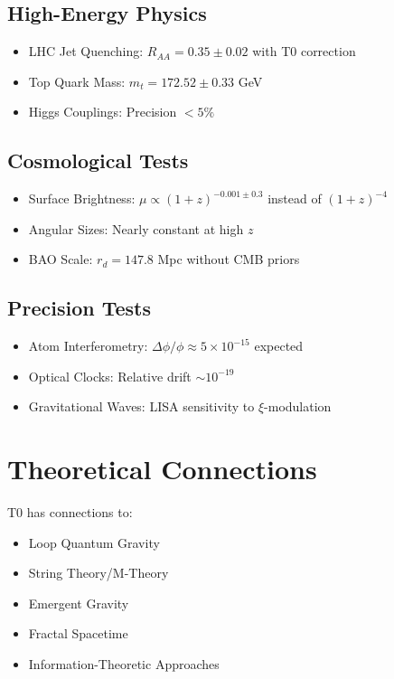 	\subsection{High-Energy Physics}
	\begin{itemize}
		\item LHC Jet Quenching: $R_{AA} = 0.35 \pm 0.02$ with T0 correction \cite{cms2024, alice2023}
		\item Top Quark Mass: $m_t = 172.52 \pm 0.33$ GeV \cite{cms2023top}
		\item Higgs Couplings: Precision $< 5\%$ \cite{atlas2023higgs}
	\end{itemize}
	
	\subsection{Cosmological Tests}
	\begin{itemize}
		\item Surface Brightness: $\mu \propto (1+z)^{-0.001\pm0.3}$ instead of $(1+z)^{-4}$ \cite{lerner2014}
		\item Angular Sizes: Nearly constant at high $z$ \cite{lopez2010}
		\item BAO Scale: $r_d = 147.8$ Mpc without CMB priors \cite{desi2025}
	\end{itemize}
	
	\subsection{Precision Tests}
	\begin{itemize}
		\item Atom Interferometry: $\Delta\phi/\phi \approx 5 \times 10^{-15}$ expected \cite{kasevich2023}
		\item Optical Clocks: Relative drift $\sim 10^{-19}$ \cite{ludlow2015, brewer2019}
		\item Gravitational Waves: LISA sensitivity to $\xi$-modulation \cite{lisa2017}
	\end{itemize}
	
	\section{Theoretical Connections}
	
	T0 has connections to:
	\begin{itemize}
		\item Loop Quantum Gravity \cite{rovelli2004, ashtekar2004}
		\item String Theory/M-Theory \cite{polchinski1998, becker2007}
		\item Emergent Gravity \cite{verlinde2011, jacobson1995}
		\item Fractal Spacetime \cite{nottale1993, elnaschie2004}
		\item Information-Theoretic Approaches \cite{susskind1995, maldacena1998}
	\end{itemize}
	
